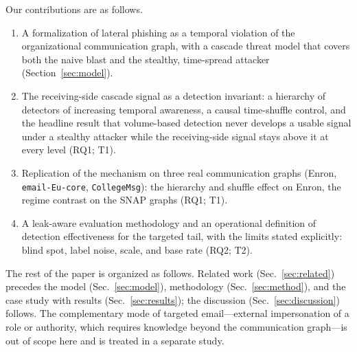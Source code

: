 Our contributions are as follows.
\begin{enumerate}[noitemsep,topsep=2pt]
  \item A formalization of lateral phishing as a temporal violation of the organizational communication
  graph, with a cascade threat model that covers both the naive blast and the stealthy, time-spread attacker
  (Section~\ref{sec:model}).
  \item The receiving-side cascade signal as a detection invariant: a hierarchy of detectors of increasing
  temporal awareness, a causal time-shuffle control, and the headline result that volume-based detection
  never develops a usable signal under a stealthy attacker while the receiving-side signal stays
  above it at every level (RQ1; T1).
  \item Replication of the mechanism on three real communication graphs (Enron, \texttt{email-Eu-core},
  \texttt{CollegeMsg}): the hierarchy and shuffle effect on Enron, the regime contrast on the SNAP
  graphs (RQ1; T1).
  \item A leak-aware evaluation methodology and an operational definition of detection effectiveness for the
  targeted tail, with the limits stated explicitly: blind spot, label noise, scale, and base rate (RQ2; T2).
\end{enumerate}

The rest of the paper is organized as follows. Related work (Sec.~\ref{sec:related}) precedes the model
(Sec.~\ref{sec:model}), methodology (Sec.~\ref{sec:method}), and the case study with results
(Sec.~\ref{sec:results}); the discussion (Sec.~\ref{sec:discussion}) follows. The complementary mode of
targeted email---external impersonation of a role or authority, which requires knowledge beyond the
communication graph---is out of scope here and is treated in a separate study.
